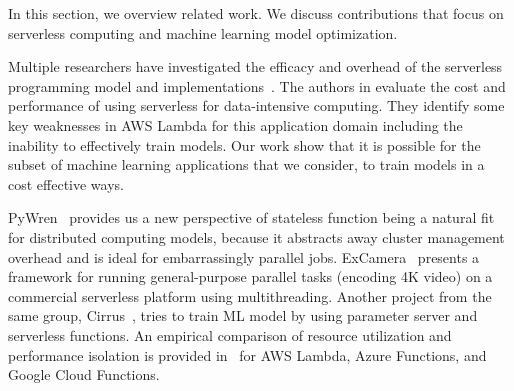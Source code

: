 In this section, we overview related work. We discuss contributions that focus
on serverless computing and machine learning model optimization. 

Multiple researchers have investigated the efficacy and overhead of the
serverless programming model and 
implementations~\cite{ref:jonas2017occupy,ref:onesteptwostep, ref:baldini2017,ref:lin2018tracking}.
The authors in \cite{ref:onesteptwostep} evaluate the cost and performance of using
serverless for data-intensive computing.  They identify some key weaknesses in AWS
Lambda for this application domain including the inability to effectively train models.
Our work show that it is possible for the subset of machine learning applications that we 
consider, to train models in a cost effective ways.

PyWren~\cite{ref:jonas2017occupy} provides us a new perspective of stateless function being a natural fit for distributed computing models, because it 
abstracts away cluster management overhead and is ideal for embarrassingly parallel jobs. 
ExCamera~\cite{ref:encoding} presents a 
framework for running general-purpose parallel tasks (encoding 4K video) 
on a commercial serverless platform using multithreading. Another project from the same group, Cirrus~\cite{ref:jonas2019cloud}, tries to train ML model by using parameter server and serverless functions. An empirical comparison of resource utilization and performance isolation
is provided in~\cite{ref:peeking} for AWS Lambda, 
Azure Functions, and Google Cloud Functions.



